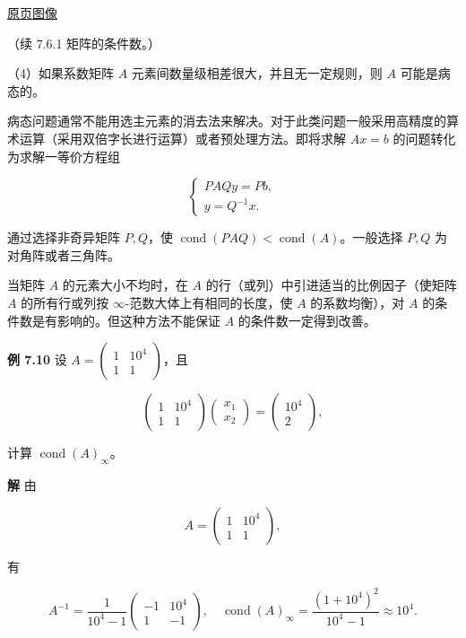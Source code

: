\documentclass[
  10pt,
  fontset=fandol]{ctexart}
\begin{document}
\href{../../source-images/pdf-209.jpeg}{原页图像}

（续 7.6.1 矩阵的条件数。）

（4）如果系数矩阵 \(A\) 元素间数量级相差很大，并且无一定规则，则 \(A\) 可能是病态的。

病态问题通常不能用选主元素的消去法来解决。对于此类问题一般采用高精度的算术运算（采用双倍字长进行运算）或者预处理方法。即将求解 \(Ax=b\) 的问题转化为求解一等价方程组

\[
\begin{cases}
PAQy=Pb,\\
y=Q^{-1}x.
\end{cases}
\]

通过选择非奇异矩阵 \(P,Q\)，使 \(\operatorname{cond}(PAQ)<\operatorname{cond}(A)\)。一般选择 \(P,Q\) 为对角阵或者三角阵。

当矩阵 \(A\) 的元素大小不均时，在 \(A\) 的行（或列）中引进适当的比例因子（使矩阵 \(A\) 的所有行或列按 \(\infty\)-范数大体上有相同的长度，使 \(A\) 的系数均衡），对 \(A\) 的条件数是有影响的。但这种方法不能保证 \(A\) 的条件数一定得到改善。

\textbf{例 7.10} 设 \(A=\begin{pmatrix}1&10^4\\1&1\end{pmatrix}\)，且

\[
\begin{pmatrix}1&10^4\\1&1\end{pmatrix}
\begin{pmatrix}x_1\\x_2\end{pmatrix}
=\begin{pmatrix}10^4\\2\end{pmatrix},
\tag{7.6.9}
\]

计算 \(\operatorname{cond}(A)_\infty\)。

\textbf{解} 由

\[
A=\begin{pmatrix}1&10^4\\1&1\end{pmatrix},
\]

有

\[
A^{-1}=\frac1{10^4-1}\begin{pmatrix}-1&10^4\\1&-1\end{pmatrix},\quad
\operatorname{cond}(A)_\infty=\frac{(1+10^4)^2}{10^4-1}\approx10^4.
\]
\end{document}
